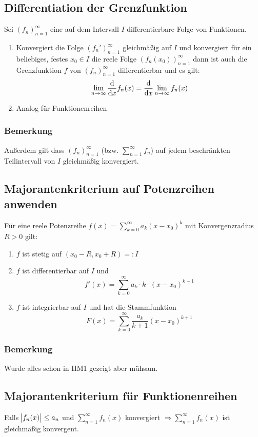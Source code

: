 \subsection{Differentiation der Grenzfunktion}
Sei ${(f_n)}_{n=1}^\infty$ eine auf dem Intervall $I$ differentierbare Folge von
Funktionen.
\begin{enumerate}[label= (\alph*)]
    \item Konvergiert die Folge ${(f_n')}_{n=1}^\infty$ gleichmäßig auf $I$ und konvergiert
    für ein beliebiges, festes $x_0 \in I$ die reele Folge ${(f_n(x_0))}_{n=1}^\infty$
    dann ist auch die Grenzfunktion $f$ von ${(f_n)}_{n=1}^\infty$ differentierbar
    und es gilt:
    \begin{equation*}
        \lim_{n \rightarrow \infty} \dfrac{\text{d}}{\text{d}x} f_n(x) = \dfrac{\text{d}}{\text{d}x} \lim_{n \rightarrow \infty} f_n(x)
    \end{equation*}
    \item Analog für Funktionenreihen
\end{enumerate}

\subsubsection{Bemerkung}
Außerdem gilt dass ${(f_n)}_{n=1}^\infty$ (bzw. $\sum_{n=1}^\infty f_n$) auf jedem
beschränkten Teilintervall von $I$ gleichmäßig konvergiert.

\subsection{Majorantenkriterium auf Potenzreihen anwenden}
Für eine reele Potenzreihe $f(x) = \sum_{k=0}^\infty a_k {(x-x_0)}^k$ mit
Konvergenzradius $R > 0$ gilt:
\begin{enumerate}[label= (\alph*)]
    \item $f$ ist stetig auf $(x_0 - R, x_0 + R) =: I$
    \item $f$ ist differentierbar auf $I$ und
        \begin{equation*}
            f'(x) = \sum_{k=0}^\infty a_k \cdot k \cdot {(x-x_0)}^{k-1}
        \end{equation*}
    \item $f$ ist integrierbar auf $I$ und hat die Stammfunktion
        \begin{equation*}
            F(x) = \sum_{k=0}^\infty \frac{a_k}{k+1} {(x-x_0)}^{k+1}
        \end{equation*}
\end{enumerate}

\subsubsection{Bemerkung}
Wurde alles schon in HM1 gezeigt aber mühsam.

\subsection{Majorantenkriterium für Funktionenreihen}
Falls $\abs{f_n(x)} \leq a_n$ und $\sum_{n=1}^\infty f_n(x)$ konvergiert
$\Rightarrow \sum_{n=1}^\infty f_n(x)$ ist gleichmäßig konvergent.
